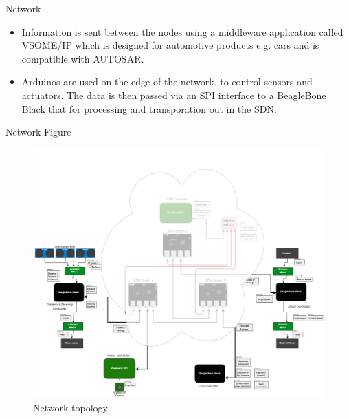 \documentclass[final,hyperref={pdfpagelabels=false}]{beamer}
\begin{document}
\begin{frame}[t]
\begin{columns}[t]
\begin{column}{.465\textwidth}
\begin{block}{Network}
\begin{itemize}
        \item Information is sent between the nodes using a middleware application called VSOME/IP which is designed for automotive products e.g. cars and is compatible with AUTOSAR. 
        
        \item Arduinos are used on the edge of the network, to control sensors and actuators. The data is then passed via an SPI interface to a BeagleBone Black that for processing and transporation out in the SDN.  
    \end{itemize}

\end{block}

\begin{block}{Network Figure}
    \begin{figure}
        \includegraphics[width=1\linewidth]{network.png}
        \caption{Network topology}
        \label{pic:network}
        \end{figure}
    
\end{block}



%	





\end{column}
\end{columns}
\end{frame}
\end{document}
